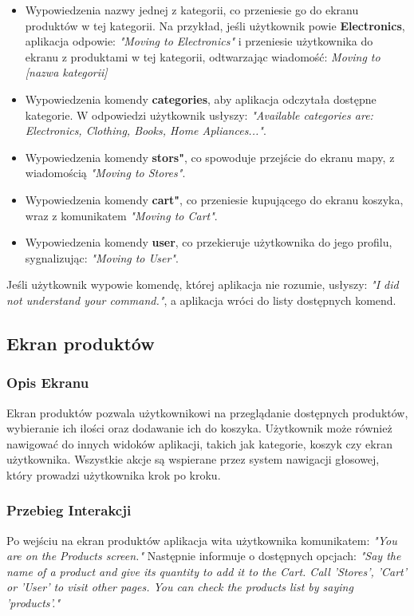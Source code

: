 \begin{itemize}
    \item Wypowiedzenia nazwy jednej z kategorii, co przeniesie go do ekranu produktów w tej kategorii.  
    Na przykład, jeśli użytkownik powie \textbf{Electronics}, aplikacja odpowie:  
    \textit{"Moving to Electronics"} i przeniesie użytkownika do ekranu z produktami w tej kategorii, odtwarzając wiadomość: \textit{Moving to [nazwa kategorii]}
    \item Wypowiedzenia komendy \textbf{categories}, aby aplikacja odczytała dostępne kategorie. W odpowiedzi użytkownik usłyszy: \textit{"Available categories are: Electronics, Clothing, Books, Home Apliances..."}.
    \item Wypowiedzenia komendy \textbf{stors"}, co spowoduje przejście do ekranu mapy, z wiadomością \textit{"Moving to Stores"}.
    \item Wypowiedzenia komendy \textbf{cart"}, co przeniesie kupującego do ekranu koszyka, wraz z komunikatem \textit{"Moving to Cart"}.
    \item Wypowiedzenia komendy \textbf{user}, co przekieruje użytkownika do jego profilu, sygnalizując: \textit{"Moving to User"}.
\end{itemize}

Jeśli użytkownik wypowie komendę, której aplikacja nie rozumie, usłyszy:  
\textit{"I did not understand your command."}, a aplikacja wróci do listy dostępnych komend.

\subsection{Ekran produktów}

\subsubsection{Opis Ekranu}
Ekran produktów pozwala użytkownikowi na przeglądanie dostępnych produktów, wybieranie ich ilości oraz dodawanie ich do koszyka. Użytkownik może również nawigować do innych widoków aplikacji, takich jak kategorie, koszyk czy ekran użytkownika. Wszystkie akcje są wspierane przez system nawigacji głosowej, który prowadzi użytkownika krok po kroku.

\subsubsection{Przebieg Interakcji}
Po wejściu na ekran produktów aplikacja wita użytkownika komunikatem: \textit{"You are on the Products screen."} Następnie informuje o dostępnych opcjach: \textit{"Say the name of a product and give its quantity to add it to the Cart. Call 'Stores', 'Cart' or 'User' to visit other pages. You can check the products list by saying 'products'."}

